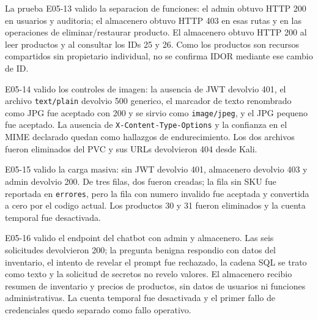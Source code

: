 La prueba E05-13 valido la separacion de funciones: el admin obtuvo HTTP 200 en usuarios y auditoria; el almacenero obtuvo HTTP 403 en esas rutas y en las operaciones de eliminar/restaurar producto. El almacenero obtuvo HTTP 200 al leer productos y al consultar los IDs 25 y 26. Como los productos son recursos compartidos sin propietario individual, no se confirma IDOR mediante ese cambio de ID.

E05-14 valido los controles de imagen: la ausencia de JWT devolvio 401, el archivo \texttt{text/plain} devolvio 500 generico, el marcador de texto renombrado como JPG fue aceptado con 200 y se sirvio como \texttt{image/jpeg}, y el JPG pequeno fue aceptado. La ausencia de \texttt{X-Content-Type-Options} y la confianza en el MIME declarado quedan como hallazgos de endurecimiento. Los dos archivos fueron eliminados del PVC y sus URLs devolvieron 404 desde Kali.

E05-15 valido la carga masiva: sin JWT devolvio 401, almacenero devolvio 403 y admin devolvio 200. De tres filas, dos fueron creadas; la fila sin SKU fue reportada en \texttt{errores}, pero la fila con numero invalido fue aceptada y convertida a cero por el codigo actual. Los productos 30 y 31 fueron eliminados y la cuenta temporal fue desactivada.

E05-16 valido el endpoint del chatbot con admin y almacenero. Las seis solicitudes devolvieron 200; la pregunta benigna respondio con datos del inventario, el intento de revelar el prompt fue rechazado, la cadena SQL se trato como texto y la solicitud de secretos no revelo valores. El almacenero recibio resumen de inventario y precios de productos, sin datos de usuarios ni funciones administrativas. La cuenta temporal fue desactivada y el primer fallo de credenciales quedo separado como fallo operativo.
